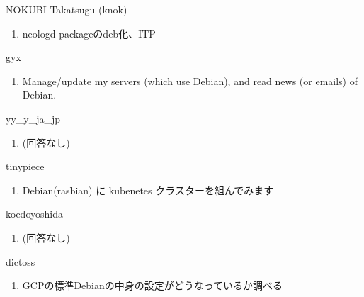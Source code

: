 \begin{prework}{ NOKUBI Takatsugu (knok)}
  \begin{enumerate}
  \item neologd-packageのdeb化、ITP
  \end{enumerate}
\end{prework}

\begin{prework}{ gyx }
  \begin{enumerate}
  \item Manage/update my servers (which use Debian), and read news (or emails) of Debian.
  \end{enumerate}
\end{prework}

\begin{prework}{ yy\_y\_ja\_jp }
  \begin{enumerate}
  \item (回答なし)
  \end{enumerate}
\end{prework}

\begin{prework}{ tinypiece }
  \begin{enumerate}
  \item Debian(rasbian) に kubenetes クラスターを組んでみます
  \end{enumerate}
\end{prework}

\begin{prework}{ koedoyoshida }
  \begin{enumerate}
  \item (回答なし)
  \end{enumerate}
\end{prework}

\begin{prework}{ dictoss }
  \begin{enumerate}
  \item GCPの標準Debianの中身の設定がどうなっているか調べる
  \end{enumerate}
\end{prework}
